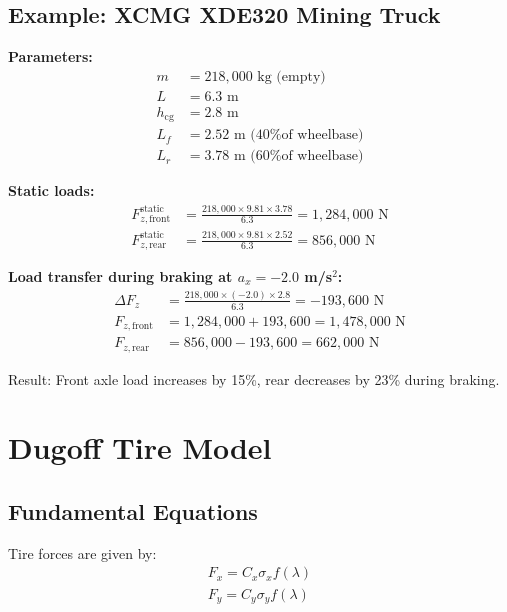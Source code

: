 \documentclass[11pt,a4paper]{article}
\begin{document}
\subsection{Example: XCMG XDE320 Mining Truck}

\textbf{Parameters:}
\begin{align}
m &= 218{,}000 \text{ kg (empty)} \\
L &= 6.3 \text{ m} \\
h_{\text{cg}} &= 2.8 \text{ m} \\
L_f &= 2.52 \text{ m (40\% of wheelbase)} \\
L_r &= 3.78 \text{ m (60\% of wheelbase)}
\end{align}

\textbf{Static loads:}
\begin{align}
F_{z,\text{front}}^{\text{static}} &= \frac{218{,}000 \times 9.81 \times 3.78}{6.3} = 1{,}284{,}000 \text{ N} \\
F_{z,\text{rear}}^{\text{static}} &= \frac{218{,}000 \times 9.81 \times 2.52}{6.3} = 856{,}000 \text{ N}
\end{align}

\textbf{Load transfer during braking at $a_x = -2.0$ m/s$^2$:}
\begin{align}
\Delta F_z &= \frac{218{,}000 \times (-2.0) \times 2.8}{6.3} = -193{,}600 \text{ N} \\
F_{z,\text{front}} &= 1{,}284{,}000 + 193{,}600 = 1{,}478{,}000 \text{ N} \\
F_{z,\text{rear}} &= 856{,}000 - 193{,}600 = 662{,}000 \text{ N}
\end{align}

Result: Front axle load increases by 15\%, rear decreases by 23\% during braking.

\section{Dugoff Tire Model}
\label{sec:dugoff}

\subsection{Fundamental Equations}

Tire forces are given by:
\begin{align}
\boxed{F_x = C_x \sigma_x f(\lambda)} \label{eq:Fx_dugoff}\\
\boxed{F_y = C_y \sigma_y f(\lambda)} \label{eq:Fy_dugoff}
\end{align}
\end{document}
